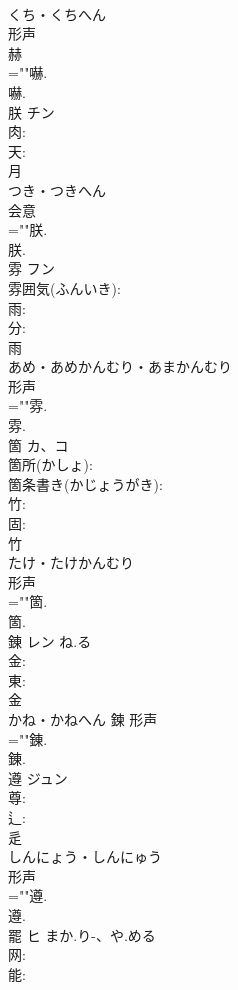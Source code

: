 \documentclass[8pt]{extreport}
\begin{document}
\begin{CJK}{UTF8}{min}
\\	くち・くちへん	
\\	形声 
\\	赫 
\\	=""嚇.
\\	嚇.
\\	朕	チン			
\\	肉: 
\\	天: 
\\	月	
\\	つき・つきへん	
\\	会意 
\\	=""朕.
\\	朕.
\\	雰	フン			
\\	雰囲気(ふんいき): 
\\	雨: 
\\	分: 
\\	雨	
\\	あめ・あめかんむり・あまかんむり	
\\	形声 
\\	=""雰.
\\	雰.
\\	箇	カ、コ			
\\	箇所(かしょ): 
\\	箇条書き(かじょうがき): 
\\	竹: 
\\	固: 
\\	竹	
\\	たけ・たけかんむり	
\\	形声 
\\	=""箇.
\\	箇.
\\	錬	レン	ね.る		
\\	金: 
\\	東: 
\\	金	
\\	かね・かねへん	鍊	形声 
\\	=""錬.
\\	錬.
\\	遵	ジュン			
\\	尊: 
\\	辶: 
\\	辵	
\\	しんにょう・しんにゅう	
\\	形声 
\\	=""遵.
\\	遵.
\\	罷	ヒ	まか.り-、や.める		
\\	网: 
\\	能: 

\end{CJK}
\end{document}
